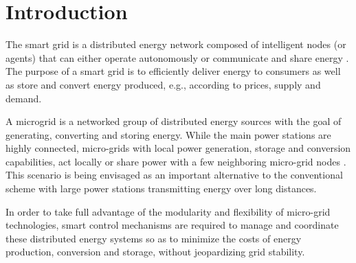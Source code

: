 \section{Introduction}

The smart grid is a distributed energy network composed of intelligent
nodes (or agents) that can either operate autonomously or communicate and share energy \cite{weiss1999multiagent}.
The purpose of a smart grid is to efficiently deliver energy to consumers as well as store and convert
energy produced, e.g., according to prices, supply and demand. 

A microgrid is a networked group of distributed energy sources with the goal of
generating, converting and storing energy. 
While the main power stations are highly connected, micro-grids with local power generation, storage
and conversion capabilities, act locally or share power with a few neighboring micro-grid nodes \cite{farhangi2010path}.
This scenario is being envisaged as an important alternative to the conventional scheme with
large power stations transmitting energy over long distances.

 In order to take full advantage of the modularity and flexibility of micro-grid technologies, smart
control mechanisms are required to manage and coordinate these distributed energy systems so as to
minimize the costs of energy production, conversion and storage, without jeopardizing grid stability.

